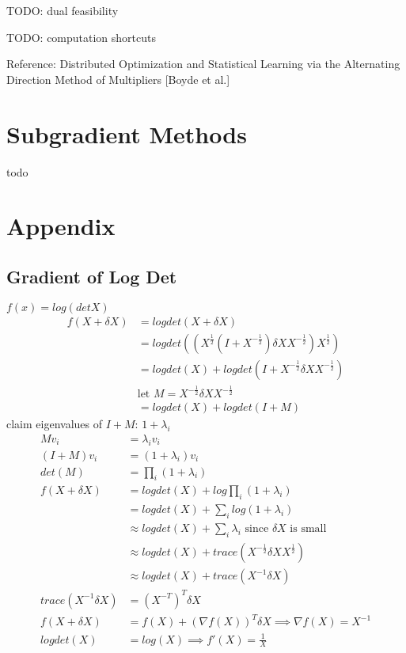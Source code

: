 \documentclass[8pt]{report}
\begin{document}
\begin{multicols*}{2}
  TODO: dual feasibility
  
  TODO: computation shortcuts
  
  Reference: Distributed Optimization and Statistical Learning via the Alternating Direction Method of Multipliers [Boyde et al.]
  
  \vfill\null
  
  \pagebreak

  \section{Subgradient Methods}

  todo

  \vfill\null
  
  \pagebreak
  
  \section{Appendix}

  \subsection{Gradient of Log Det}
  $f(x)=log(det X)$\\
  \begin{align*}
    f(X+\delta X) &= logdet(X+\delta X)\\
                  &= logdet((X^{\frac{1}{2}}(I+X^{-\frac{1}{2}}) \delta X X^{-\frac{1}{2}})X^{\frac{1}{2}})\\
                  &= logdet(X)+logdet(I+X^{-\frac{1}{2}} \delta X X^{-\frac{1}{2}})\\
                  & \text{let } M = X^{-\frac{1}{2}} \delta X X^{-\frac{1}{2}}\\
                  &= logdet(X)+logdet(I+M)
  \end{align*}
  claim eigenvalues of $I+M$: $1+\lambda_i$
  \begin{align*}
    Mv_i &= \lambda_i v_i\\
    (I+M)v_i &= (1+\lambda_i)v_i\\
    det(M)&=\prod_i(1+\lambda_i)\\
    f(X+\delta X) &= logdet(X) + log \prod_i(1+\lambda_i)\\
         &= logdet(X) + \sum_i log(1+\lambda_i)\\
         &\approx logdet(X) + \sum_i \lambda_i \text{ since } \delta X \text{ is small}\\
         &\approx logdet(X) + trace(X^{-\frac{1}{2}} \delta X X^{\frac{1}{2}})\\
         &\approx logdet(X) + trace(X^{-1} \delta X)\\
    trace(X^{-1} \delta X) &= (X^{-T})^T \delta X\\
    f(X+\delta X) &= f(X) + (\nabla f(X))^T \delta X \implies \nabla f(X) = X^{-1}\\
    logdet(X) &= log(X) \implies f'(X)=\frac{1}{X}
  \end{align*}
    

\end{multicols*}
\end{document}
